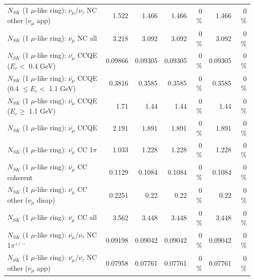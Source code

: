 \begin{table}
\begin{tabular}{| l | r | r | r  r | r  r |}
     $N_{SK}$ (1 $\mu$-like ring): $\nu_\mu$/$\nu_\tau$ NC other ($\nu_\mu$ app) &           1.522 &           1.466 &           1.466 &        0 \%  &           1.466 &        0 \%  \\ 
                                $N_{SK}$ (1 $\mu$-like ring): $\nu_{\mu}$ NC all &           3.218 &           3.092 &           3.092 &        0 \%  &           3.092 &        0 \%  \\ 
\hline
\hline
\hline
          $N_{SK}$ (1 $\mu$-like ring): $\bar{\nu_\mu}$ CCQE ($E_{r} <$ 0.4 GeV) &         0.09866 &         0.09305 &         0.09305 &        0 \%  &         0.09305 &        0 \%  \\ 
 $N_{SK}$ (1 $\mu$-like ring): $\bar{\nu_\mu}$ CCQE (0.4 $\leq E_{r} <$ 1.1 GeV) &          0.3816 &          0.3585 &          0.3585 &        0 \%  &          0.3585 &        0 \%  \\ 
       $N_{SK}$ (1 $\mu$-like ring): $\bar{\nu_\mu}$ CCQE ($E_{r} \geq$ 1.1 GeV) &            1.71 &            1.44 &            1.44 &        0 \%  &            1.44 &        0 \%  \\ 
\hline
                              $N_{SK}$ (1 $\mu$-like ring): $\bar{\nu_\mu}$ CCQE &           2.191 &           1.891 &           1.891 &        0 \%  &           1.891 &        0 \%  \\ 
                         $N_{SK}$ (1 $\mu$-like ring): $\bar{\nu_\mu}$ CC 1$\pi$ &           1.033 &           1.228 &           1.228 &        0 \%  &           1.228 &        0 \%  \\ 
                       $N_{SK}$ (1 $\mu$-like ring): $\bar{\nu_\mu}$ CC coherent &          0.1129 &          0.1084 &          0.1084 &        0 \%  &          0.1084 &        0 \%  \\ 
        $N_{SK}$ (1 $\mu$-like ring): $\bar{\nu_\mu}$ CC other ($\nu_\mu$ disap) &          0.2251 &            0.22 &            0.22 &        0 \%  &            0.22 &        0 \%  \\ 
                          $N_{SK}$ (1 $\mu$-like ring): $\bar{\nu_{\mu}}$ CC all &           3.562 &           3.448 &           3.448 &        0 \%  &           3.448 &        0 \%  \\ 
\hline
  $N_{SK}$ (1 $\mu$-like ring): $\bar{\nu_\mu}$/$\bar{\nu_\tau}$ NC 1$\pi^{+/-}$ &         0.09198 &         0.09042 &         0.09042 &        0 \%  &         0.09042 &        0 \%  \\ 
$N_{SK}$ (1 $\mu$-like ring): $\bar{\nu_\mu}$/$\bar{\nu_\tau}$ NC other ($\nu_\mu$ app) &         0.07958 &         0.07761 &         0.07761 &        0 \%  &         0.07761 &        0 \%  \\ 

\end{tabular}
\end{table}
